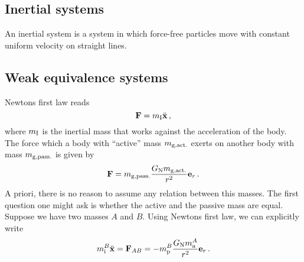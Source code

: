 \subsection{Inertial systems}
\begin{definition}
An inertial system is a system in which force-free particles move with constant uniform velocity on straight lines.
\end{definition}
\subsection*{Weak equivalence systems}
Newtons first law reads
\begin{equation}
    \vec{F}=m\textsubscript{I} \ddot{\vec{x}} \, ,
\end{equation}
where $m\textsubscript{I}$ is the inertial mass that works against the acceleration of the body.
The force which a body with ``active'' mass $m\textsubscript{g,act.}$ exerts on another
body with mass $m\textsubscript{g,pass.}$ is given by 
\begin{equation}
    \vec{F}=m\textsubscript{g,pass.}\frac{G\textsubscript{N}m\textsubscript{g,act.}}{r^2}\vec{e}_r \, .
\end{equation}
A priori, there is no reason to assume any relation between this masses.
The first question one might ask is whether the active and the passive mass are equal.
Suppose we have two masses $A$ and $B$. Using Newtons first law, we can explicitly write
\begin{equation}
    m^{B}_{\text{i}}\ddot{\vec{x}}=\vec{F}_{AB}=-	m^{B}_{\text{p}}\frac{G\textsubscript{N}m^{A}_{\text{a}}}{r^2}\vec{e}_r \, .
\end{equation}
